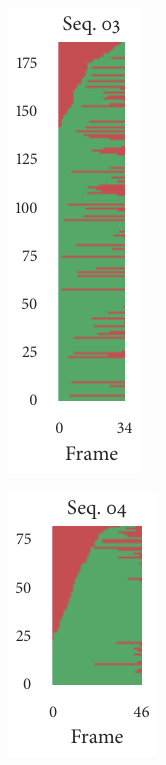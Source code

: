 \begin{figure}[h]
\begin{subfigure}[b]{0.2\textwidth}
	\end{subfigure}%
	\begin{subfigure}[b]{0.2\textwidth}
		\centering
		\includegraphics{missingness_sequence03.pdf}
	\end{subfigure}%
	\begin{subfigure}[b]{0.2\textwidth}
		\centering
		\includegraphics{missingness_sequence04.pdf}
	\end{subfigure}%
	\begin{subfigure}[b]{0.2\textwidth}
		\centering

\end{subfigure}
\end{figure}
